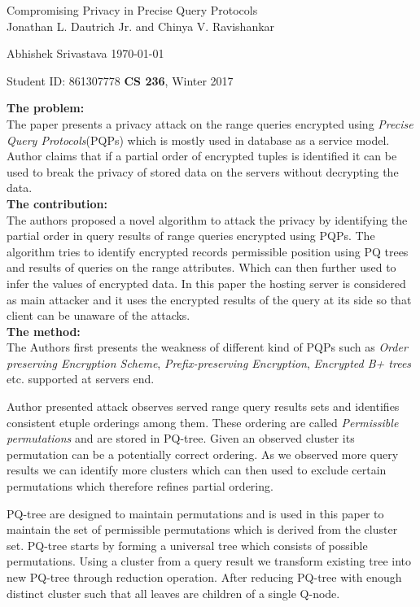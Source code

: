\documentclass[a4paper,12pt, twoside]{article}
\renewcommand{\maketitle}{%
 	\Large
 	\begin{center}
 	Compromising Privacy in Precise Query Protocols\\	
 	\normalsize Jonathan L. Dautrich Jr. and Chinya V. Ravishankar
 	\end{center}
 
 	\Large
	Abhishek Srivastava
	\hfill
	\normalsize
	\today
 	\par
 	Student ID: 861307778
 	\hfill
 	\textbf{CS 236}, Winter 2017
 	\par 	
 	\hrulefill
 	\par
 	}
\begin{document}
\thispagestyle{empty}
	
\maketitle
\textbf{The problem:}\\
The paper presents a privacy attack on the range queries encrypted using \emph{Precise Query Protocols}(PQPs) which is mostly used in database as a service model. Author claims that if a partial order of encrypted tuples is identified it can be used to break the privacy of stored data on the servers without decrypting the data.\\   

\textbf{The contribution:}\\
The authors proposed a novel algorithm to attack the privacy by identifying the partial order in query results of range queries encrypted using PQPs. The algorithm tries to identify encrypted records permissible position using PQ trees and results of queries on the range attributes. Which can then further used to infer the values of encrypted data. In this paper the hosting server is considered as main attacker and it uses the encrypted results of the query at its side so that client can be unaware of the attacks.\\ 
 
\textbf{The method:}\\
The Authors first presents the weakness of different kind of PQPs  such as \emph{Order preserving Encryption Scheme}, \emph{Prefix-preserving Encryption}, \emph{Encrypted B+ trees} etc. supported at servers end. 

Author presented attack observes served range query results sets and identifies consistent etuple orderings among them. These ordering are called \emph{Permissible permutations} and are stored in PQ-tree. Given an observed cluster its permutation can be a potentially correct ordering. As we observed  more query results we can identify more clusters which can then used to exclude certain  permutations which therefore refines partial ordering.

PQ-tree are designed to maintain permutations and is used in this paper to maintain the set of permissible permutations which is derived from the cluster set. PQ-tree starts by forming a universal tree which consists of possible permutations. Using a cluster from a query result we transform existing tree into new PQ-tree through reduction operation. After reducing PQ-tree with enough distinct cluster such that all leaves are children of a single Q-node.
\end{document}
